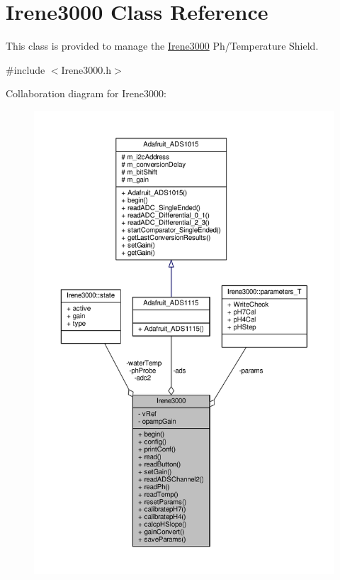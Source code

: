 \hypertarget{class_irene3000}{}\section{Irene3000 Class Reference}
\label{class_irene3000}


This class is provided to manage the \hyperlink{class_irene3000}{Irene3000} Ph/\+Temperature Shield.  




{\ttfamily \#include $<$Irene3000.\+h$>$}



Collaboration diagram for Irene3000\+:\nopagebreak
\begin{figure}[H]
\begin{center}
\leavevmode
\includegraphics[width=350pt]{da/d7b/class_irene3000__coll__graph}
\end{center}
\end{figure}
